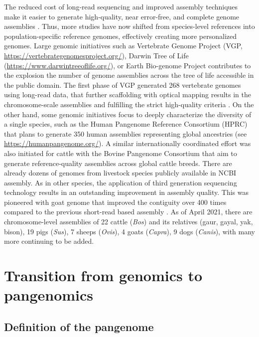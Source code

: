 \documentclass[../main.tex]{subfiles}
\begin{document}
The reduced cost of long-read sequencing and improved assembly techniques  make it easier to generate high-quality, near error-free, and complete genome assemblies \citep{miga2020telomere,logsdon2021structure}. Thus, more studies have now shifted from species-level references into population-specific reference genomes, effectively creating more personalized genomes. Large genomic initiatives such as Vertebrate Genome Project (VGP, \url{https://vertebrategenomesproject.org/}), Darwin Tree of Life (\url{https://www.darwintreeoflife.org/}), or Earth Bio-genome Project \citep{lewin2018earth} contributes to the explosion the number of genome assemblies across the tree of life accessible in the public domain. The first phase of VGP generated 268 vertebrate genomes using long-read data, that further scaffolding with optical mapping results in the chromosome-scale assemblies and fulfilling the strict high-quality criteria \citep{rhie2020towards}. On the other hand, some genomic initiatives focus to deeply characterize the diversity of a single species, such as the Human Pangenome Reference Consortium (HPRC) that plans to generate 350 human assemblies representing global ancestries (see \url{https://humanpangenome.org/}). A similar internationally coordinated effort was also initiated for cattle with the Bovine Pangenome Consortium \citep{heaton2021reference} that aim to generate reference-quality assemblies across global cattle breeds. There are already dozens of genomes from livestock species publicly available in NCBI assembly. As in other species, the application of third generation sequencing technology results in an outstanding improvement in assembly quality. This was pioneered with goat genome that improved the contiguity over 400 times compared to the previous short-read based assembly \citep{bickhart2017single}. As of April 2021, there are chromosome-level assemblies of 22 cattle (\emph{Bos}) and its relatives (gaur, gayal, yak, bison), 19 pigs (\emph{Sus}), 7 sheeps (\emph{Ovis}), 4 goats (\emph{Capra}), 9 dogs (\emph{Canis}), with many more continuing to be added.

\section{Transition from genomics to pangenomics}

\subsection{Definition of the pangenome}
\end{document}
